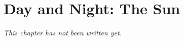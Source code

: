 \chapter{Day and Night: The Sun}\label{ch:g1:day-and-night}


\emph{This chapter has not been written yet.}
